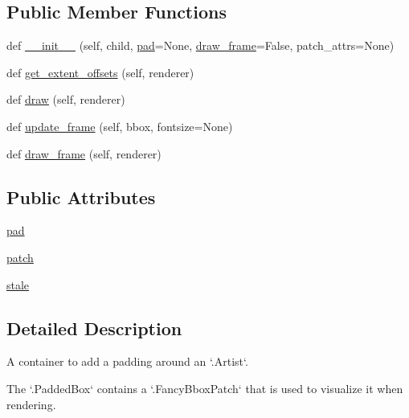 \subsection*{Public Member Functions}
\begin{DoxyCompactItemize}
\item 
def \hyperlink{classmatplotlib_1_1offsetbox_1_1PaddedBox_a5bb949d97f91fe2f0ccbaf883fb44395}{\+\_\+\+\_\+init\+\_\+\+\_\+} (self, child, \hyperlink{classmatplotlib_1_1offsetbox_1_1PaddedBox_ade280c188133f9b5d46a608ae9e92487}{pad}=None, \hyperlink{classmatplotlib_1_1offsetbox_1_1PaddedBox_a3cc7ce8ee1967f95e0c3ba1b6a091989}{draw\+\_\+frame}=False, patch\+\_\+attrs=None)
\item 
def \hyperlink{classmatplotlib_1_1offsetbox_1_1PaddedBox_a263c31f179f8f17c542e18842eab1ab2}{get\+\_\+extent\+\_\+offsets} (self, renderer)
\item 
def \hyperlink{classmatplotlib_1_1offsetbox_1_1PaddedBox_ae91687d58b70a1a63b93c32706ac4e79}{draw} (self, renderer)
\item 
def \hyperlink{classmatplotlib_1_1offsetbox_1_1PaddedBox_a0a74b1c1840d494826eacc525308eefe}{update\+\_\+frame} (self, bbox, fontsize=None)
\item 
def \hyperlink{classmatplotlib_1_1offsetbox_1_1PaddedBox_a3cc7ce8ee1967f95e0c3ba1b6a091989}{draw\+\_\+frame} (self, renderer)
\end{DoxyCompactItemize}
\subsection*{Public Attributes}
\begin{DoxyCompactItemize}
\item 
\hyperlink{classmatplotlib_1_1offsetbox_1_1PaddedBox_ade280c188133f9b5d46a608ae9e92487}{pad}
\item 
\hyperlink{classmatplotlib_1_1offsetbox_1_1PaddedBox_a004f010f254230f2b6b8c665fc3fc97c}{patch}
\item 
\hyperlink{classmatplotlib_1_1offsetbox_1_1PaddedBox_a9eed701f8146289a346cea52ea8818dd}{stale}
\end{DoxyCompactItemize}


\subsection{Detailed Description}
\begin{DoxyVerb}A container to add a padding around an `.Artist`.

The `.PaddedBox` contains a `.FancyBboxPatch` that is used to visualize
it when rendering.
\end{DoxyVerb}
 

